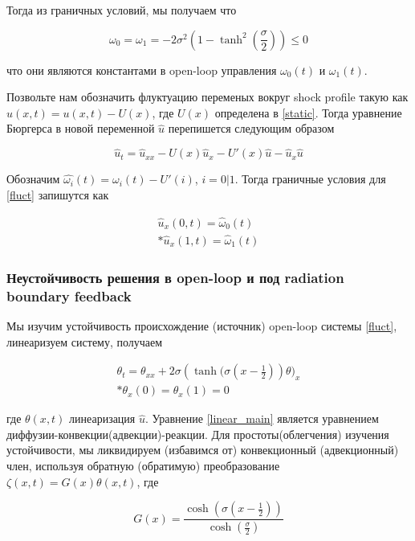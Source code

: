 Тогда из граничных условий, мы получаем что 

\begin{equation}
  \omega_0 = \omega_1 = -2\sigma^2(1 - \tanh^2{(\frac{\sigma}{2})}) \le 0
\end{equation}

что они являются константами в open-loop управления $\omega_0(t)$ и $\omega_1(t)$.

Позвольте нам обозначить флуктуацию переменых вокруг shock profile такую как $\hat{u}(x, t) = u(x, t) - U(x)$, где $U(x)$ определена в \eqref{static}. Тогда уравнение Бюргерса в новой переменной $\hat{u}$ перепишется следующим образом

\begin{equation}\label{fluct}
  \hat{u}_t = \hat{u}_{xx} - U(x)\hat{u}_x - U'(x)\hat{u} - \hat{u}_x\hat{u}
\end{equation}

Обозначим $\hat{\omega_i}(t) = \omega_i(t) - U'(i)$, $i = 0|1$. Тогда граничные условия для \eqref{fluct} запишутся как

\begin{gather}
  \hat{u}_x(0, t) = \hat{\omega}_0(t) \\*
  \hat{u}_x(1, t) = \hat{\omega}_1(t) \nonumber
\end{gather}


\subsubsection{Неустойчивость решения в open-loop и под radiation boundary feedback}

Мы изучим устойчивость происхождение (источник) open-loop системы \eqref{fluct}, линеаризуем систему, получаем 

\begin{gather} \label{linear_main}
  \theta_t = \theta_{xx} + 2\sigma(\tanh{(\sigma(x - \frac{1}{2})})\theta)_x \\* 
  \theta_x(0) = \theta_x(1) = 0
\end{gather}

где $\theta(x, t)$ линеаризация $\hat{u}$. Уравнение \eqref{linear_main} является уравнением диффузии-конвекции(адвекции)-реакции. Для простоты(облегчения) изучения устойчивости, мы ликвидируем (избавимся от) конвекционный (адвекционный) член, используя обратную (обратимую) преобразование $\zeta(x, t) = G(x)\theta(x, t)$, где

\begin{equation}
  G(x) = \frac{\cosh(\sigma(x - \frac{1}{2}))}{\cosh(\frac{\sigma}{2})}
\end{equation} 

